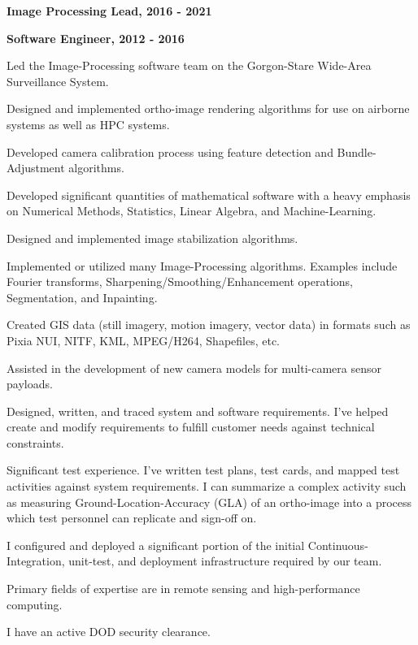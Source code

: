 \documentclass[10pt]{article}
\newenvironment{outerlist}[1][\enskip\textbullet]%
        {\begin{itemize}[#1]}{\end{itemize}%
         \vspace{-.6\baselineskip}}
\newenvironment{innerlist}[1][\enskip\textbullet]%
        {\begin{compactitem}[#1]}{\end{compactitem}}
\begin{document}
\begin{outerlist}
         \item \textbf{Image Processing Lead, 2016 - 2021}
         \item \textbf{Software Engineer, 2012 - 2016} 
         \begin{innerlist}
            \item Led the Image-Processing software team on the Gorgon-Stare Wide-Area Surveillance System.
            \item Designed and implemented ortho-image rendering algorithms for use on airborne systems as well as HPC systems.
            \item Developed camera calibration process using feature detection and Bundle-Adjustment algorithms.
            \item Developed significant quantities of mathematical software with a heavy emphasis on Numerical Methods, Statistics, Linear Algebra, and Machine-Learning.
            \item Designed and implemented image stabilization algorithms.
            \item Implemented or utilized many Image-Processing algorithms. Examples include Fourier transforms, Sharpening/Smoothing/Enhancement operations, Segmentation, and Inpainting.
            \item Created GIS data (still imagery, motion imagery, vector data) in formats
                  such as Pixia NUI, NITF, KML, MPEG/H264, Shapefiles, etc.
            \item Assisted in the development of new camera models for multi-camera sensor payloads.
            \item Designed, written, and traced system and software requirements.  I've helped create and modify requirements to fulfill customer needs against technical constraints.
            \item Significant test experience.  I've written test plans, test cards, and mapped test activities against system requirements. I can summarize a complex activity such as measuring Ground-Location-Accuracy (GLA) of an ortho-image into a process which test personnel can replicate and sign-off on.
         \item I configured and deployed a significant portion of the initial Continuous-Integration, unit-test, and deployment infrastructure 
               required by our team.
         \end{innerlist}
         \item Primary fields of expertise are in remote sensing and high-performance computing. 
         \item I have an active DOD security clearance.\\
     \end{outerlist}
\end{document}
